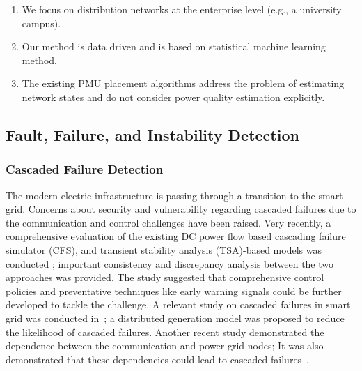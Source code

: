 \begin{enumerate}
\item We focus on distribution networks at the enterprise level (e.g., a university campus).
\item Our method is data driven and is based on statistical machine learning method.
\item The existing PMU placement algorithms address the problem of estimating network states and do not consider power quality estimation explicitly.
\end{enumerate}


\subsection{Fault, Failure, and Instability Detection}
\subsubsection{Cascaded Failure Detection}
The modern electric infrastructure is passing through a transition to the smart grid. Concerns about security and vulnerability regarding cascaded failures due to the communication and control challenges have been raised. Very recently, a comprehensive evaluation of the existing DC power flow based cascading failure simulator (CFS), and transient stability analysis (TSA)-based models was conducted \cite{yan2015cascading}; important consistency and discrepancy analysis between the two approaches was provided. The study suggested that comprehensive control policies and preventative techniques like early warning signals could be further developed to tackle the challenge. A relevant study on cascaded failures in smart grid was conducted in~\cite{chen2010cascading}; a distributed generation model was proposed to reduce the likelihood of cascaded failures. Another recent study demonstrated the dependence between the communication and power grid nodes; It was also demonstrated that these dependencies could lead to cascaded failures~\cite{parandehgheibi2014mitigating}.

